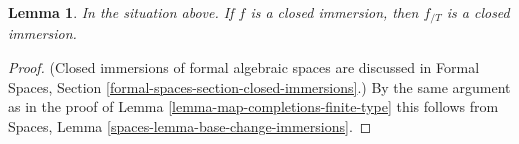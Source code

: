 \documentclass[10pt,a4paper]{amsart}
\theoremstyle{plain}
\newtheorem{lemma}[subsection]{Lemma}
\theoremstyle{definition}
\theoremstyle{remark}
\numberwithin{equation}{subsection}
\begin{document}
\begin{lemma}
\label{lemma-closed-immersion-gives-closed-immersion}
In the situation above. If $f$ is a closed immersion, then
$f_{/T}$ is a closed immersion.
\end{lemma}

\begin{proof}
(Closed immersions of formal algebraic spaces are discussed in
Formal Spaces, Section
\ref{formal-spaces-section-closed-immersions}.)
By the same argument as in the proof of
Lemma \ref{lemma-map-completions-finite-type} this follows from
Spaces, Lemma
\ref{spaces-lemma-base-change-immersions}.
\end{proof}
\end{document}
